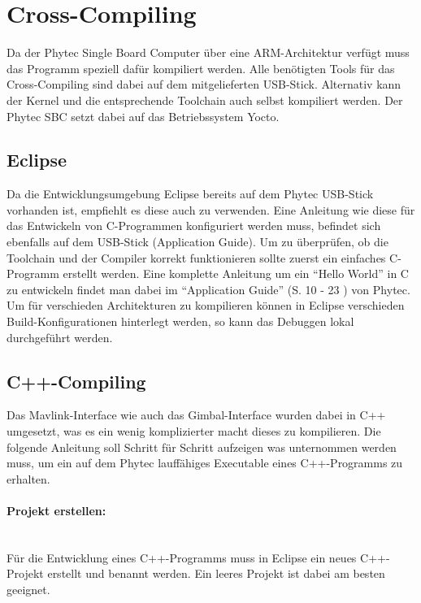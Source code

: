 \documentclass[12pt]{article} %
\begin{document}
	
	\section{Cross-Compiling}
		
	Da der Phytec Single Board Computer über eine ARM-Architektur verfügt  muss das Programm speziell dafür kompiliert werden. Alle benötigten Tools für das Cross-Compiling sind dabei auf dem mitgelieferten USB-Stick. Alternativ kann der Kernel und die entsprechende Toolchain auch selbst kompiliert werden. Der Phytec SBC setzt dabei auf das Betriebssystem Yocto.
		
	\subsection{Eclipse}
	Da die Entwicklungsumgebung Eclipse bereits auf dem Phytec USB-Stick vorhanden ist, empfiehlt es diese auch zu verwenden. Eine Anleitung wie diese für das Entwickeln von C-Programmen konfiguriert werden muss, befindet sich ebenfalls auf dem USB-Stick (Application Guide). Um zu überprüfen, ob die Toolchain und der Compiler korrekt funktionieren sollte zuerst ein einfaches C-Programm erstellt werden. Eine komplette Anleitung um ein "`Hello World"' in C zu entwickeln findet man dabei im "`Application Guide"' (S. 10 - 23 \cite{phytec}) von Phytec. Um für verschieden Architekturen zu kompilieren können in Eclipse verschieden Build-Konfigurationen hinterlegt werden, so kann das Debuggen lokal durchgeführt werden.
		
	\subsection{C++-Compiling}
	Das Mavlink-Interface wie auch das Gimbal-Interface wurden dabei in C++ umgesetzt, was es ein wenig komplizierter macht dieses zu kompilieren. Die folgende Anleitung soll Schritt für Schritt aufzeigen was unternommen werden muss, um ein auf dem Phytec lauffähiges Executable eines C++-Programms zu erhalten.
		
	\paragraph*{Projekt erstellen:}\ \\
	Für die Entwicklung eines C++-Programms muss in Eclipse ein neues C++-Projekt erstellt und benannt werden. Ein leeres Projekt ist dabei am besten geeignet.
		
\end{document}
